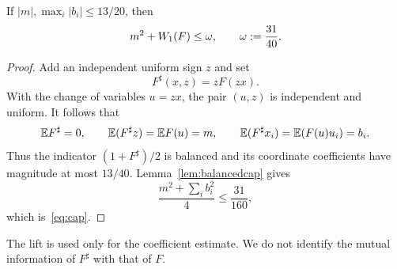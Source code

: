 \begin{proposition}\label{prop:cap}
If $|m|,\max_i|b_i|\le13/20$, then
\begin{equation}\label{eq:cap}
m^2+W_1(F)\le\omega,\qquad \omega:=\frac{31}{40}.
\end{equation}
\end{proposition}
\begin{proof}
Add an independent uniform sign $z$ and set
\[
F^\sharp(x,z)=zF(zx).
\]
With the change of variables $u=zx$, the pair $(u,z)$ is independent and uniform. It follows that
\[
\mathbb E F^\sharp=0,\qquad
\mathbb E(F^\sharp z)=\mathbb E F(u)=m,\qquad
\mathbb E(F^\sharp x_i)=\mathbb E(F(u)u_i)=b_i.
\]
Thus the indicator $(1+F^\sharp)/2$ is balanced and its coordinate coefficients have magnitude at most $13/40$. Lemma~\ref{lem:balancedcap} gives
\[
\frac{m^2+\sum_i b_i^2}{4}\le\frac{31}{160},
\]
which is~\eqref{eq:cap}.
\end{proof}
The lift is used only for the coefficient estimate. We do not identify the mutual information of $F^\sharp$ with that of $F$.
